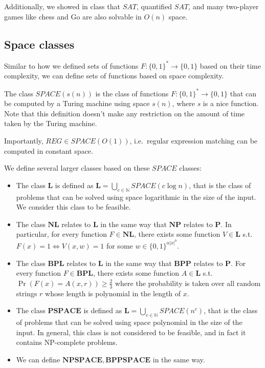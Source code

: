 \documentclass[10pt]{article}
\theoremstyle{definition}
\begin{document}
Additionally, we showed in class that $SAT$, quantified $SAT$, and many two-player games like chess and Go are also solvable in $O(n)$ space.

\subsection{Space classes}
Similar to how we defined sets of functions $F : \{0,1\}^* \rightarrow \{0,1\}$ based on their time complexity, we can define sets of functions based on space complexity.  

The class $SPACE(s(n))$ is the class of functions $F : \{0,1\}^* \rightarrow \{0,1\}$ that can be computed by a Turing machine using space $s(n)$, where $s$ is a nice function.  Note that this definition doesn't make any restriction on the amount of time taken by the Turing machine.

Importantly, $REG \in SPACE(O(1))$, i.e.\ regular expression matching can be computed in constant space.

We define several larger classes based on these $SPACE$ classes:
\begin{itemize}
    \item The class $\mathbf{L}$ is defined as $\mathbf{L} = \displaystyle \bigcup_{c \in \mathbb{N}} SPACE(c \log n)$, that is the class of problems that can be solved using space logarithmic in the size of the input.  We consider this class to be feasible.
    \item The class $\mathbf{NL}$ relates to $\mathbf{L}$ in the same way that $\mathbf{NP}$ relates to $\mathbf{P}$.  In particular, for every function $F \in \mathbf{NL}$, there exists some function $V \in \mathbf{L}$ s.t.\ $F(x) = 1 \iff V(x,w) = 1$ for some $w \in \{0,1\}^{a|x|^b}$.
    \item The class $\mathbf{BPL}$ relates to $\mathbf{L}$ in the same way that $\mathbf{BPP}$ relates to $\mathbf{P}$.  For every function $F \in \mathbf{BPL}$, there exists some function $A \in \mathbf{L}$ s.t.\ $\Pr(F(x) = A(x,r)) \geq \frac{2}{3}$ where the probability is taken over all random strings $r$ whose length is polynomial in the length of $x$.
    \item The class $\mathbf{PSPACE}$ is defined as $\mathbf{L} = \displaystyle \bigcup_{c \in \mathbb{N}} SPACE(n^c)$, that is the class of problems that can be solved using space polynomial in the size of the input.  In general, this class is not considered to be feasible, and in fact it contains NP-complete problems.  
    \item We can define $\mathbf{NPSPACE},\mathbf{BPPSPACE}$ in the same way.
\end{itemize}
\end{document}
